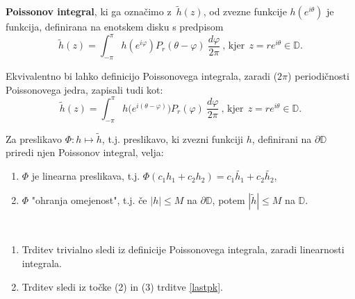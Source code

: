 \documentclass[mat1]{fmfdelo}
\begin{document}
    \begin{definicija}
        \textbf{Poissonov integral}, ki ga označimo z~$\widetilde{h}(z)$, od zvezne funkcije $h(e^{i\theta})$ je funkcija, definirana na enotskem disku s predpisom
        $$
        \widetilde{h}(z) = \int_{-\pi}^{\pi}{h(e^{i\varphi}) P_r(\theta - \varphi)~\frac{d\varphi}{2 \pi}}~\text{, kjer}~~z = r e^{i\theta} \in \mathbb{D}.
        $$
     \end{definicija}
     \begin{opomba}
        Ekvivalentno bi lahko definicijo Poissonovega integrala, zaradi ($2\pi$) periodičnosti Poissonovega jedra,  zapisali tudi kot:
        $$
        \widetilde{h}(z) = \int_{-\pi}^{\pi}{h\big(e^{i(\theta-\varphi)}\big) P_r(\varphi)~\frac{d\varphi}{2 \pi}}~\text{, kjer}~~z = r e^{i\theta} \in \mathbb{D}.
        $$
     \end{opomba}
     \begin{trditev}
        \label{lastpi}
        Za  preslikavo $\Phi : h \mapsto \widetilde{h}$, t.j. preslikavo, ki  zvezni funkciji $h$, definirani na $\partial \mathbb{D}$ priredi njen Poissonov integral, velja:
        \begin{enumerate}
            \item $\Phi$ je linearna preslikava, t.j. $\Phi(c_1 h_1 + c_2 h_2) = c_1 \widetilde{h_1} + c_2 \widetilde{h_2}$,
            \item $\Phi$ "ohranja omejenost", t.j. če $|h| \leq M$ na $\partial \mathbb{D}$, potem $|\widetilde{h}| \leq M$ na $\mathbb{D}$.
        \end{enumerate}
     \end{trditev}
     \begin{dokaz}
        $ $
        \begin{enumerate}
            \item Trditev trivialno sledi iz definicije Poissonovega integrala, zaradi linearnosti integrala. 
            \item Trditev sledi iz točke (2) in (3) trditve \ref{lastpk}.
        \end{enumerate}
     \end{dokaz}
        
\end{document}
